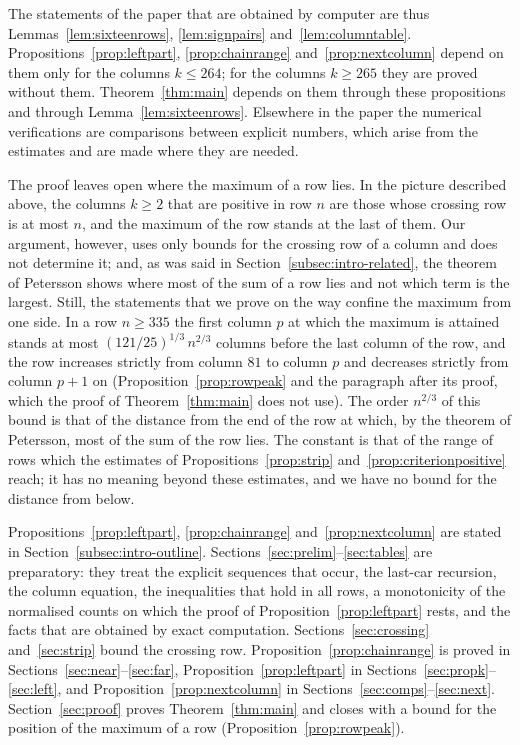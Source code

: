 \documentclass{amsart}
\makeatletter
\theoremstyle{definition}
\theoremstyle{remark}
\numberwithin{equation}{section}
\def\subsection{\@startsection{subsection}{2}\z@{.5\linespacing\@plus.7\linespacing}{-.5em}{\normalfont\bfseries\boldmath}}
\makeatother
\begin{document}
The statements of the paper that are obtained by computer are thus Lemmas~\ref{lem:sixteenrows}, \ref{lem:signpairs} and~\ref{lem:columntable}. Propositions~\ref{prop:leftpart}, \ref{prop:chainrange} and~\ref{prop:nextcolumn} depend on them only for the columns $k\le 264$; for the columns $k\ge 265$ they are proved without them. Theorem~\ref{thm:main} depends on them through these propositions and through Lemma~\ref{lem:sixteenrows}. Elsewhere in the paper the numerical verifications are comparisons between explicit numbers, which arise from the estimates and are made where they are needed.

The proof leaves open where the maximum of a row lies. In the picture described above, the columns $k\ge 2$ that are positive in row $n$ are those whose crossing row is at most $n$, and the maximum of the row stands at the last of them. Our argument, however, uses only bounds for the crossing row of a column and does not determine it; and, as was said in Section~\ref{subsec:intro-related}, the theorem of Petersson shows where most of the sum of a row lies and not which term is the largest. Still, the statements that we prove on the way confine the maximum from one side. In a row $n\ge 335$ the first column $p$ at which the maximum is attained stands at most $(121/25)^{1/3}\,n^{2/3}$ columns before the last column of the row, and the row increases strictly from column $81$ to column $p$ and decreases strictly from column $p+1$ on (Proposition~\ref{prop:rowpeak} and the paragraph after its proof, which the proof of Theorem~\ref{thm:main} does not use). The order $n^{2/3}$ of this bound is that of the distance from the end of the row at which, by the theorem of Petersson, most of the sum of the row lies. The constant is that of the range of rows which the estimates of Propositions~\ref{prop:strip} and~\ref{prop:criterionpositive} reach; it has no meaning beyond these estimates, and we have no bound for the distance from below.

\subsection{Organisation of the paper}\label{subsec:intro-organisation}

Propositions~\ref{prop:leftpart}, \ref{prop:chainrange} and~\ref{prop:nextcolumn} are stated in Section~\ref{subsec:intro-outline}. Sections~\ref{sec:prelim}--\ref{sec:tables} are preparatory: they treat the explicit sequences that occur, the last-car recursion, the column equation, the inequalities that hold in all rows, a monotonicity of the normalised counts on which the proof of Proposition~\ref{prop:leftpart} rests, and the facts that are obtained by exact computation. Sections~\ref{sec:crossing} and~\ref{sec:strip} bound the crossing row. Proposition~\ref{prop:chainrange} is proved in Sections~\ref{sec:near}--\ref{sec:far}, Proposition~\ref{prop:leftpart} in Sections~\ref{sec:propk}--\ref{sec:left}, and Proposition~\ref{prop:nextcolumn} in Sections~\ref{sec:comps}--\ref{sec:next}. Section~\ref{sec:proof} proves Theorem~\ref{thm:main} and closes with a bound for the position of the maximum of a row (Proposition~\ref{prop:rowpeak}).
\end{document}

